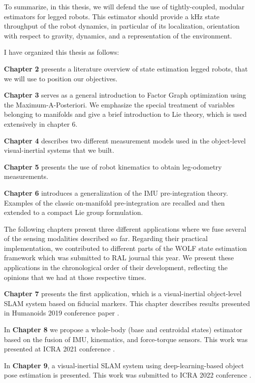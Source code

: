 To summarize, in this thesis, we will defend the use of tightly-coupled, modular estimators for legged robots. This estimator should provide a kHz state 
throughput of the robot dynamics, in particular of its localization, orientation with respect to gravity, dynamics, and a representation of the environment.

I have organized this thesis as follows:

\bigskip
\textbf{Chapter 2} presents a literature overview of state estimation legged robots, that we will use to position our objectives.

\bigskip
\textbf{Chapter 3} serves as a general introduction to Factor Graph optimization using the Maximum-A-Posteriori. We emphasize the special treatment of variables belonging to manifolds and give a brief introduction to Lie theory, which is used extensively in chapter 6.

\bigskip
\textbf{Chapter 4} describes two different measurement models used in the object-level visual-inertial systems that we built. 

\bigskip
\textbf{Chapter 5} presents the use of robot kinematics to obtain leg-odometry measurements. 

\bigskip
\textbf{Chapter 6} introduces a generalization of the IMU pre-integration theory. Examples of the classic on-manifold pre-integration are recalled and 
then extended to a compact Lie group formulation. 

\bigskip
The following chapters present three different applications where we fuse several of the sensing modalities described so far.
Regarding their practical implementation, we contributed to different parts of the WOLF state estimation framework \cite{sola2021wolf} which was 
submitted to RAL journal this year. We present these applications in the chronological order of their development, reflecting the opinions that
we had at those respective times.

\bigskip
\textbf{Chapter 7} presents the first application, which is a visual-inertial object-level SLAM system based on fiducial markers. This chapter describes
results presented in Humanoids 2019 conference paper \cite{fourmy2019absolute}.

\bigskip
In \textbf{Chapter 8} we propose a whole-body (base and centroidal states) estimator based on the fusion of IMU, kinematics, and force-torque sensors. This
work was presented at ICRA 2021 conference \cite{fourmy2021contact}.

\bigskip
In \textbf{Chapter 9}, a visual-inertial SLAM system using deep-learning-based object pose estimation is presented. This work was submitted to ICRA 2022 conference 
\cite{debeunne2021cosyslam}.





